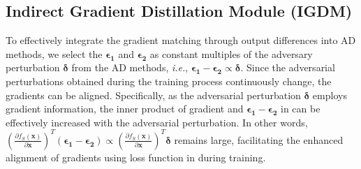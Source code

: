 \documentclass{article} %
\newcommand{\ie}{\emph{i.e.}}
\begin{document}
\subsection{Indirect Gradient Distillation Module (IGDM)}
To effectively integrate the gradient matching through output differences into AD methods, we select the $\boldsymbol{\epsilon_1}$ and $\boldsymbol{\epsilon_2}$ as constant multiples of the adversary perturbation $\boldsymbol{\delta}$ from the AD methods, \ie, $ \boldsymbol{\epsilon_1} - \boldsymbol{\epsilon_2} \propto \boldsymbol{\delta}$.
Since the adversarial perturbations obtained during the training process continuously change, the gradients can be aligned.
Specifically, as the adversarial perturbation $\boldsymbol{\delta}$ employs gradient information, the inner product of gradient and $\boldsymbol{\epsilon_1} - \boldsymbol{\epsilon_2}$ in  can be effectively increased with the adversarial perturbation.
In other words, 
$( \frac{\partial f_S(\textbf{x})}{\partial \textbf{x}})^T(\boldsymbol{\epsilon_1} - \boldsymbol{\epsilon_2}) \propto ( \frac{\partial f_S(\textbf{x})}{\partial \textbf{x}})^T \boldsymbol{\delta}$ remains large, facilitating the enhanced alignment of gradients using loss function in  during training.
\end{document}
